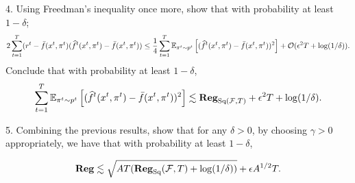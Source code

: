 4. Using Freedman’s inequality once more, show that with probability at least $1-\delta$;
\[ 2\sum_{t=1}^T (r^t-\bar f(x^t,\pi^t)(\wh f^t(x^t,\pi^t)-\bar f(x^t,\pi^t))\leq \frac{1}{4}\sum_{t=1}^T \EEs{(\wh f^t(x^t,\pi^t)-\bar f(x^t,\pi^t))^2}{\pi^t \sim p^t}  + \OO(\epsilon^2 T + \log(1/\delta)).\]
Conclude that with probability at least $1-\delta$,
\[ \sum_{t=1}^T \EEs{(\wh f^t(x^t,\pi^t)- \bar f(x^t,\pi^t))^2}{\pi^t \sim p^t} \lesssim \Reg_{\text{Sq}(\F,T)}+ \epsilon^2T+\log(1/\delta).\]

5. Combining the previous results, show that for any $\delta > 0$,
 by choosing $\gamma > 0$ appropriately, we have that with probability at least $1-\delta$,

 \[ \Reg \lesssim \sqrt{AT(\Reg_{\text{Sq}}(\F,T)+\log(1/\delta))} +\epsilon A^{1/2}T.  \]


 \begin{solution}[TODO]
\end{solution}
